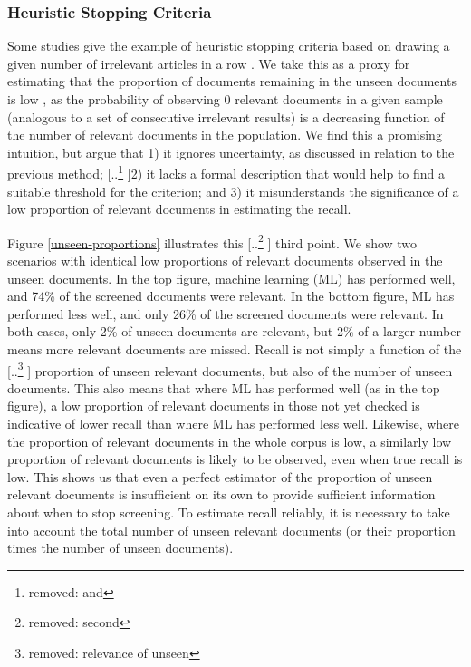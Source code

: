 \documentclass{bmcart}
\providecommand{\DIFadd}[1]{{\protect\color{blue} \sf #1}} %
\providecommand{\DIFdel}[1]{{\protect\color{red} [..\footnote{removed: #1} ]}} %
\providecommand{\DIFaddbegin}{} %
\providecommand{\DIFaddend}{} %
\providecommand{\DIFdelbegin}{} %
\providecommand{\DIFdelend}{} %
\newcommand{\DIFscaledelfig}{0.5}
\newlength{\DIFdelgraphicswidth} %
\newlength{\DIFdelgraphicsheight} %
\newcommand{\DIFaddincludegraphics}[2][]{{\color{blue}\fbox{\DIFOincludegraphics[#1]{#2}}}} %
\newcommand{\DIFdelincludegraphics}[2][]{%
\sbox{\DIFdelgraphicsbox}{\DIFOincludegraphics[#1]{#2}}%
\settoboxwidth{\DIFdelgraphicswidth}{\DIFdelgraphicsbox} %
\settoboxtotalheight{\DIFdelgraphicsheight}{\DIFdelgraphicsbox} %
\scalebox{\DIFscaledelfig}{%
\parbox[b]{\DIFdelgraphicswidth}{\usebox{\DIFdelgraphicsbox}\\[-\baselineskip] \rule{\DIFdelgraphicswidth}{0em}}\llap{\resizebox{\DIFdelgraphicswidth}{\DIFdelgraphicsheight}{%
\setlength{\unitlength}{\DIFdelgraphicswidth}%
\begin{picture}(1,1)%
\thicklines\linethickness{2pt} %
{\color[rgb]{1,0,0}\put(0,0){\framebox(1,1){}}}%
{\color[rgb]{1,0,0}\put(0,0){\line( 1,1){1}}}%
{\color[rgb]{1,0,0}\put(0,1){\line(1,-1){1}}}%
\end{picture}%
}\hspace*{3pt}}} %
} %
\DeclareRobustCommand{\DIFaddbegin}{\DIFOaddbegin \let\includegraphics\DIFaddincludegraphics} %
\DeclareRobustCommand{\DIFaddend}{\DIFOaddend \let\includegraphics\DIFOincludegraphics} %
\DeclareRobustCommand{\DIFdelbegin}{\DIFOdelbegin \let\includegraphics\DIFdelincludegraphics} %
\DeclareRobustCommand{\DIFdelend}{\DIFOaddend \let\includegraphics\DIFOincludegraphics} %
\begin{document}
	
	
	\subsubsection*{Heuristic Stopping Criteria}

	Some studies give the example of heuristic stopping criteria based on drawing a given number of irrelevant articles in a row \cite{Jonnalagadda2013, Przybya2018}. 
	We take this as a proxy for estimating that the proportion of documents remaining in the unseen documents is low\DIFaddbegin \DIFadd{, as the probability of observing 0 relevant documents in a given sample (analogous to a set of consecutive irrelevant results) is a decreasing function of the number of relevant documents in the population}\DIFaddend .
	We find this a promising intuition, but argue that 1) it ignores uncertainty, as discussed in relation to the previous method; 
	\DIFdelbegin \DIFdel{and }\DIFdelend 2) it \DIFaddbegin \DIFadd{lacks a formal description that would help to find a suitable threshold for the criterion; and 3) it }\DIFaddend misunderstands the significance of a low proportion of relevant documents in estimating the recall.

	Figure \ref{unseen-proportions} illustrates this \DIFdelbegin \DIFdel{second }\DIFdelend \DIFaddbegin \DIFadd{third }\DIFaddend point. 
	We show two scenarios with identical low proportions of relevant documents observed in the unseen documents.
	In the top figure, machine learning (ML) has performed well, and 74\% of the screened documents were relevant. 
	In the bottom figure, ML has performed less well, and only 26\% of the screened documents were relevant.
	In both cases, only 2\% of unseen documents are relevant, but 2\% of a larger number means more relevant documents are missed.
	Recall is not simply a function of the \DIFdelbegin \DIFdel{relevance of unseen }\DIFdelend \DIFaddbegin \DIFadd{proportion of unseen relevant }\DIFaddend documents, but also of the number of unseen documents. 
	This also means that where ML has performed well (as in the top figure), a low proportion of relevant documents in those not yet checked is indicative of lower recall than where ML has performed less well.
	Likewise, where the proportion of relevant documents in the whole corpus is low, a similarly low proportion of relevant documents is likely to be observed, even when true recall is low. 
	\DIFaddbegin \DIFadd{This shows us that even a perfect estimator of the proportion of unseen relevant documents is insufficient on its own to provide sufficient information about when to stop screening. To estimate recall reliably, it is necessary to take into account the total number of unseen relevant documents (or their proportion times the number of unseen documents).
	}\DIFaddend 
\end{document}
